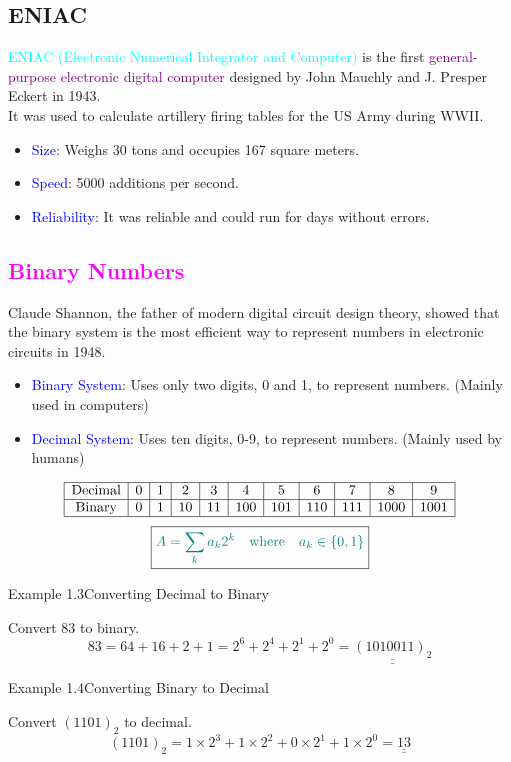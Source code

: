 \documentclass{book}
\begin{document}
\subsection{ENIAC}
\raggedright
\textcolor{cyan}{ENIAC (Electronic Numerical Integrator and Computer)} is the first \textcolor{purple}{general-purpose electronic digital computer} designed by John Mauchly and J. Presper Eckert in 1943.\\
It was used to calculate artillery firing tables for the US Army during WWII.\\
\begin{itemize}
    \item \textcolor{blue}{Size}: Weighs 30 tons and occupies 167 square meters.
    \item \textcolor{blue}{Speed}: 5000 additions per second.
    \item \textcolor{blue}{Reliability}: It was reliable and could run for days without errors.
\end{itemize}
\textcolor{magenta}{\section{\textbf{Binary Numbers}}}
Claude Shannon, the father of modern digital circuit design theory, showed that the binary system is the most efficient way to represent numbers in electronic circuits in 1948.\\
\begin{itemize}
    \item \textcolor{blue}{Binary System}: Uses only two digits, 0 and 1, to represent numbers. (Mainly used in computers)
    \item \textcolor{blue}{Decimal System}: Uses ten digits, 0-9, to represent numbers. (Mainly used by humans)
\end{itemize}
\[
\begin{array}{|c|c|c|c|c|c|c|c|c|c|c|}
    \hline
    \text{Decimal} & 0 & 1 & 2 & 3 & 4 & 5 & 6 & 7 & 8 & 9\\
    \hline
    \text{Binary} & 0 & 1 & 10 & 11 & 100 & 101 & 110 & 111 & 1000 & 1001\\
    \hline
\end{array}
\]
\[
\boxed{\textcolor{teal}{A = \sum_k a_k 2^k \quad \text{where} \quad a_k \in \{0, 1\}}}
\]
\begin{egBox}{Example 1.3}{Converting Decimal to Binary}
    \raggedright
    Convert $83$ to binary.\\
    \[
        83 = 64 + 16 + 2 + 1 = 2^6 + 2^4 + 2^1 + 2^0 = \underline{\underline{(1010011)_2}}
    \]
\end{egBox}
\newpage
\begin{egBox}{Example 1.4}{Converting Binary to Decimal}
    \raggedright
    Convert $(1101)_2$ to decimal.\\
    \[
        (1101)_2 = 1 \times 2^3 + 1 \times 2^2 + 0 \times 2^1 + 1 \times 2^0 = \underline{\underline{13}}
    \]
\end{egBox}
\end{document}
